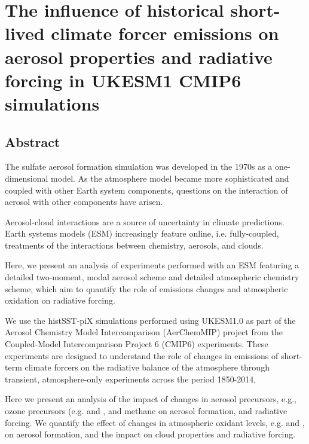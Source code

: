 \chapter{The influence of historical short-lived climate forcer emissions on aerosol properties and radiative forcing in UKESM1 CMIP6 simulations}
\label{ch3:title}
\ifpdf
    \graphicspath{{Chapter3/Figs/Raster/}{Chapter3/Figs/PDF/}{Chapter3/Figs/}}
\else
    \graphicspath{{Chapter3/Figs/Vector/}{Chapter3/Figs/}}
\fi

\section*{Abstract}

The sulfate aerosol formation simulation was developed in the 1970s as a one-dimensional model. As the atmosphere model became more sophisticated and coupled with other Earth system components, questions on the interaction of aerosol with other components have arisen.

Aerosol-cloud interactions are a source of uncertainty in climate predictions. Earth systems models (ESM) increasingly feature online, i.e. fully-coupled, treatments of the interactions between chemistry, aerosols, and clouds.  

Here, we present an analysis of experiments performed with an ESM featuring a detailed two-moment, modal aerosol scheme and detailed atmospheric chemistry scheme, which aim to quantify the role of emissions changes and atmospheric oxidation on radiative forcing.

We use the histSST-piX simulations performed using UKESM1.0 as part of the  Aerosol Chemistry Model Intercomparison (AerChemMIP) project from the Coupled-Model Intercomparison Project 6 (CMIP6) experiments. These experiments are designed to understand the role of changes in emissions of short-term climate forcers on the radiative balance of the atmosphere through transient, atmosphere-only experiments across the period 1850-2014, 

Here we present an analysis of the impact of changes in aerosol precursors, e.g., ozone precursors (e.g.  and , and methane on aerosol formation, and radiative forcing. We quantify the effect of changes in atmospheric oxidant levels, e.g.  and , on aerosol formation, and the impact on cloud properties and radiative forcing.

